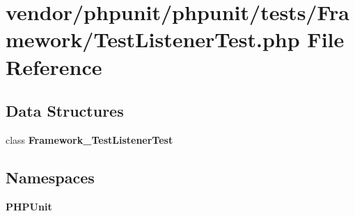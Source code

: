 \section{vendor/phpunit/phpunit/tests/\+Framework/\+Test\+Listener\+Test.php File Reference}
\label{_test_listener_test_8php}
\subsection*{Data Structures}
\begin{DoxyCompactItemize}
\item 
class {\bf Framework\+\_\+\+Test\+Listener\+Test}
\end{DoxyCompactItemize}
\subsection*{Namespaces}
\begin{DoxyCompactItemize}
\item 
 {\bf P\+H\+P\+Unit}
\end{DoxyCompactItemize}
